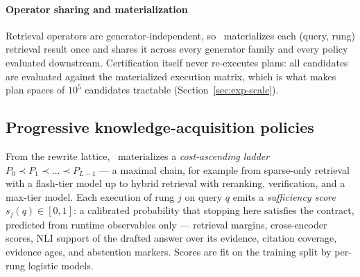 \paragraph{Operator sharing and materialization}
Retrieval operators are generator-independent, so \system\ materializes
each (query, rung) retrieval result once and shares it across every
generator family and every policy evaluated downstream. Certification
itself never re-executes plans: all candidates are evaluated against
the materialized execution matrix, which is what makes plan spaces of
$10^5$ candidates tractable (Section~\ref{sec:exp-scale}).

\subsection{Progressive knowledge-acquisition policies}
\label{sec:families}

From the rewrite lattice, \system\ materializes a \emph{cost-ascending
ladder} $P_0 \prec P_1 \prec \dots \prec P_{L-1}$ --- a maximal chain,
for example from sparse-only retrieval with a flash-tier model up to
hybrid retrieval with reranking, verification, and a max-tier model.
Each execution of rung $j$ on query $q$ emits a \emph{sufficiency
score} $s_j(q) \in [0,1]$: a calibrated probability that stopping here
satisfies the contract, predicted from runtime observables only ---
retrieval margins, cross-encoder scores, NLI support of the drafted
answer over its evidence, citation coverage, evidence ages, and
abstention markers. Scores are fit on the training split by per-rung
logistic models.

